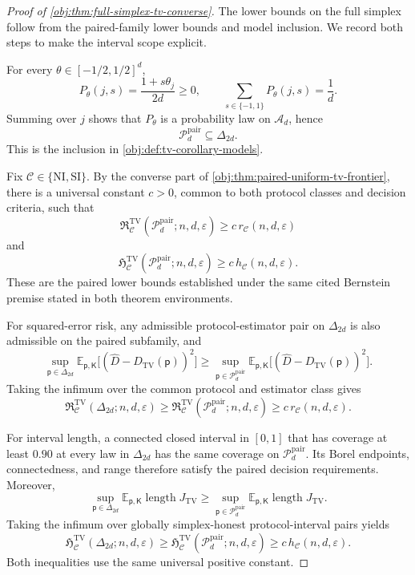 \begin{proof}[Proof of \cref{obj:thm:full-simplex-tv-converse}]
The lower bounds on the full simplex follow from the paired-family lower bounds and model inclusion. We record both steps to make the interval scope explicit.

For every \(\theta\in[-1/2,1/2]^d\),
\[
P_\theta(j,s)=\frac{1+s\theta_j}{2d}\ge0,
\qquad
\sum_{s\in\{-1,1\}}P_\theta(j,s)=\frac1d.
\]
Summing over \(j\) shows that \(P_\theta\) is a probability law on \(\mathcal A_d\), hence
\[
\mathcal P_d^{\mathrm{pair}}\subseteq\Delta_{2d}.
\]
This is the inclusion in \cref{obj:def:tv-corollary-models}. %

Fix \(\mathcal C\in\{\mathrm{NI},\mathrm{SI}\}\). By the converse part of \cref{obj:thm:paired-uniform-tv-frontier}, there is a universal constant \(c>0\), common to both protocol classes and decision criteria, such that
\[
\mathfrak R^{\mathrm{TV}}_{\mathcal C}
 (\mathcal P_d^{\mathrm{pair}};n,d,\varepsilon)
\ge c\,r_{\mathcal C}(n,d,\varepsilon)
\]
and
\[
\mathfrak H^{\mathrm{TV}}_{\mathcal C}
 (\mathcal P_d^{\mathrm{pair}};n,d,\varepsilon)
\ge c\,h_{\mathcal C}(n,d,\varepsilon).
\]
These are the paired lower bounds established under the same cited Bernstein premise stated in both theorem environments.

For squared-error risk, any admissible protocol-estimator pair on \(\Delta_{2d}\) is also admissible on the paired subfamily, and
\[
\sup_{\mathsf p\in\Delta_{2d}}
 \mathbb E_{\mathsf p,\mathsf K}
 \bigl[(\widehat D-D_{\mathrm{TV}}(\mathsf p))^2\bigr]
\ge
\sup_{\mathsf p\in\mathcal P_d^{\mathrm{pair}}}
 \mathbb E_{\mathsf p,\mathsf K}
 \bigl[(\widehat D-D_{\mathrm{TV}}(\mathsf p))^2\bigr].
\]
Taking the infimum over the common protocol and estimator class gives
\[
\mathfrak R^{\mathrm{TV}}_{\mathcal C}
 (\Delta_{2d};n,d,\varepsilon)
\ge
\mathfrak R^{\mathrm{TV}}_{\mathcal C}
 (\mathcal P_d^{\mathrm{pair}};n,d,\varepsilon)
\ge c\,r_{\mathcal C}(n,d,\varepsilon).
\]

For interval length, a connected closed interval in \([0,1]\) that has coverage at least \(0.90\) at every law in \(\Delta_{2d}\) has the same coverage on \(\mathcal P_d^{\mathrm{pair}}\). Its Borel endpoints, connectedness, and range therefore satisfy the paired decision requirements. Moreover,
\[
\sup_{\mathsf p\in\Delta_{2d}}
 \mathbb E_{\mathsf p,\mathsf K}\operatorname{length}J_{\mathrm{TV}}
\ge
\sup_{\mathsf p\in\mathcal P_d^{\mathrm{pair}}}
 \mathbb E_{\mathsf p,\mathsf K}\operatorname{length}J_{\mathrm{TV}}.
\]
Taking the infimum over globally simplex-honest protocol-interval pairs yields
\[
\mathfrak H^{\mathrm{TV}}_{\mathcal C}
 (\Delta_{2d};n,d,\varepsilon)
\ge
\mathfrak H^{\mathrm{TV}}_{\mathcal C}
 (\mathcal P_d^{\mathrm{pair}};n,d,\varepsilon)
\ge c\,h_{\mathcal C}(n,d,\varepsilon).
\]
Both inequalities use the same universal positive constant. %
\end{proof}

